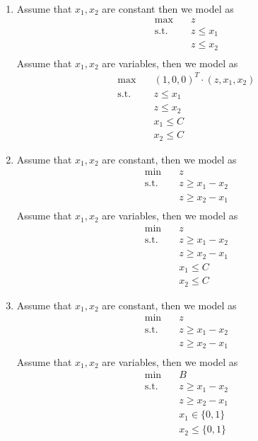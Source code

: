 \documentclass{article}
\begin{document}
\begin{solving}
    \begin{enumerate}
        \item Assume that $x_1,x_2$ are constant then we model as \begin{align*}
            \max \quad &z\\
            \text{s.t.}\quad& z\leq x_1\\
            & z\leq x_2\\
        \end{align*}  
         Assume that $x_1,x_2$ are variables, then we model as 
         \begin{align*}
            \max\quad& (1,0,0)^T\cdot(z, x_1, x_2)\\
            \text{s.t.}\quad& z\leq x_1\\
            & z\leq x_2\\
            &x_1 \leq C\\
            &x_2\leq C
        \end{align*}  
        \item Assume that $x_1,x_2$ are constant, then we model as \begin{align*}
            \min\quad& z\\
            \text{s.t.}\quad&z\geq x_1-x_2\\
            &z\geq x_2-x_1\\
        \end{align*}
        Assume that $x_1,x_2$ are variables, then we model as \begin{align*}
            \min\quad& z\\
            \text{s.t.}\quad&z\geq x_1-x_2\\
            &z\geq x_2-x_1\\
            &x_1\leq C\\
            &x_2\leq C
        \end{align*}
        \item Assume that $x_1,x_2$ are constant, then we model as \begin{align*}
            \min\quad& z\\
            \text{s.t.}\quad&z\geq x_1-x_2\\
            &z\geq x_2-x_1\\
        \end{align*}
        Assume that $x_1,x_2$ are variables, then we model as \begin{align*}
            \min\quad& B\\
            \text{s.t.}\quad&z\geq x_1-x_2\\
            &z\geq x_2-x_1\\
            &x_1\in \{0,1\}\\
            &x_2\leq \{0,1\}
            \end{align*}
    \end{enumerate}

\end{solving}
\end{document}
